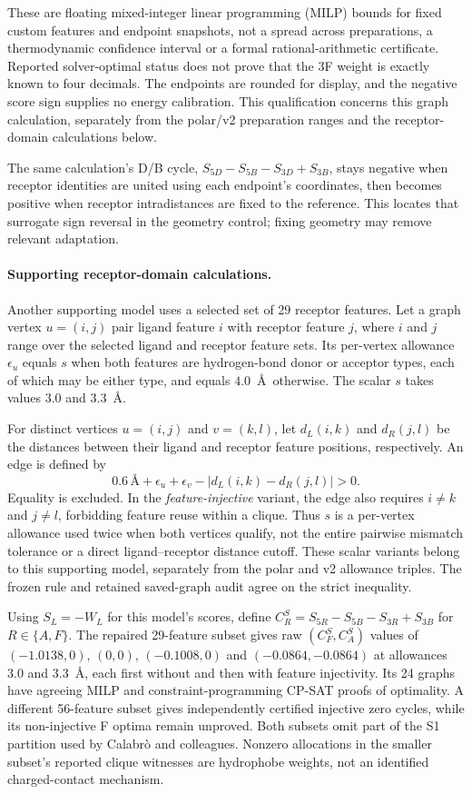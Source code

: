 \documentclass{article}
\begin{document}
These are floating mixed-integer linear programming (MILP) bounds for fixed custom features and endpoint snapshots, not a spread across preparations, a thermodynamic confidence interval or a formal rational-arithmetic certificate. Reported solver-optimal status does not prove that the 3F weight is exactly known to four decimals. The endpoints are rounded for display, and the negative score sign supplies no energy calibration. This qualification concerns this graph calculation, separately from the polar/v2 preparation ranges and the receptor-domain calculations below.

The same calculation's D/B cycle, \(S_{5D}-S_{5B}-S_{3D}+S_{3B}\), stays negative when receptor identities are united using each endpoint's coordinates, then becomes positive when receptor intradistances are fixed to the reference. This locates that surrogate sign reversal in the geometry control; fixing geometry may remove relevant adaptation.

\paragraph{Supporting receptor-domain calculations.}
Another supporting model uses a selected set of 29 receptor features. Let a graph vertex \(u=(i,j)\) pair ligand feature \(i\) with receptor feature \(j\), where \(i\) and \(j\) range over the selected ligand and receptor feature sets. Its per-vertex allowance \(\epsilon_u\) equals \(s\) when both features are hydrogen-bond donor or acceptor types, each of which may be either type, and equals \(4.0\)~\AA\ otherwise. The scalar \(s\) takes values \(3.0\) and \(3.3\)~\AA.

For distinct vertices \(u=(i,j)\) and \(v=(k,l)\), let \(d_L(i,k)\) and \(d_R(j,l)\) be the distances between their ligand and receptor feature positions, respectively. An edge is defined by
\[
 0.6\,\text{\AA}+\epsilon_u+\epsilon_v
       -|d_L(i,k)-d_R(j,l)|>0.
\]
Equality is excluded. In the \emph{feature-injective} variant, the edge also requires \(i\ne k\) and \(j\ne l\), forbidding feature reuse within a clique. Thus \(s\) is a per-vertex allowance used twice when both vertices qualify, not the entire pairwise mismatch tolerance or a direct ligand--receptor distance cutoff. These scalar variants belong to this supporting model, separately from the polar and v2 allowance triples. The frozen rule and retained saved-graph audit agree on the strict inequality.

Using \(S_L=-W_L\) for this model's scores, define \(C_R^S=S_{5R}-S_{5B}-S_{3R}+S_{3B}\) for \(R\in\{A,F\}\). The repaired 29-feature subset gives raw \((C_F^S,C_A^S)\) values of \((-1.0138,0)\), \((0,0)\), \((-0.1008,0)\) and \((-0.0864,-0.0864)\) at allowances 3.0 and 3.3~\AA, each first without and then with feature injectivity. Its 24 graphs have agreeing MILP and constraint-programming CP-SAT proofs of optimality. A different 56-feature subset gives independently certified injective zero cycles, while its non-injective F optima remain unproved. Both subsets omit part of the S1 partition used by Calabr\`o and colleagues. Nonzero allocations in the smaller subset's reported clique witnesses are hydrophobe weights, not an identified charged-contact mechanism.
\end{document}
